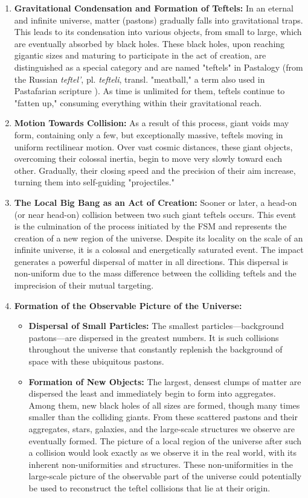 \documentclass[pdflatex,sn-mathphys-num]{sn-jnl}
\begin{document}
\begin{enumerate}
    \item \textbf{Gravitational Condensation and Formation of Teftels:} In an eternal and infinite universe, matter (pastons) gradually falls into gravitational traps. This leads to its condensation into various objects, from small to large, which are eventually absorbed by black holes. These black holes, upon reaching gigantic sizes and maturing to participate in the act of creation, are distinguished as a special category and are named "teftels" in Pastalogy (from the Russian \textit{teftel'}, pl. \textit{tefteli}, transl. "meatball," a term also used in Pastafarian scripture \cite{henderson2006}). As time is unlimited for them, teftels continue to "fatten up," consuming everything within their gravitational reach.
    \item \textbf{Motion Towards Collision:} As a result of this process, giant voids may form, containing only a few, but exceptionally massive, teftels moving in uniform rectilinear motion. Over vast cosmic distances, these giant objects, overcoming their colossal inertia, begin to move very slowly toward each other. Gradually, their closing speed and the precision of their aim increase, turning them into self-guiding "projectiles."
    \item \textbf{The Local Big Bang as an Act of Creation:} Sooner or later, a head-on (or near head-on) collision between two such giant teftels occurs. This event is the culmination of the process initiated by the FSM and represents the creation of a new region of the universe. Despite its locality on the scale of an infinite universe, it is a colossal and energetically saturated event. The impact generates a powerful dispersal of matter in all directions. This dispersal is non-uniform due to the mass difference between the colliding teftels and the imprecision of their mutual targeting.
    \item \textbf{Formation of the Observable Picture of the Universe:}
    \begin{itemize}
        \item \textbf{Dispersal of Small Particles:} The smallest particles---background pastons---are dispersed in the greatest numbers. It is such collisions throughout the universe that constantly replenish the background of space with these ubiquitous pastons.
        \item \textbf{Formation of New Objects:} The largest, densest clumps of matter are dispersed the least and immediately begin to form into aggregates. Among them, new black holes of all sizes are formed, though many times smaller than the colliding giants. From these scattered pastons and their aggregates, stars, galaxies, and the large-scale structures we observe are eventually formed. The picture of a local region of the universe after such a collision would look exactly as we observe it in the real world, with its inherent non-uniformities and structures. These non-uniformities in the large-scale picture of the observable part of the universe could potentially be used to reconstruct the teftel collisions that lie at their origin.
    \end{itemize}
\end{enumerate}
\end{document}
